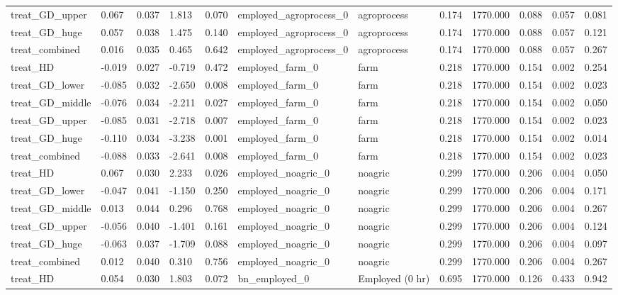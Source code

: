 \begin{tabular}{llllllllllll}
treat\_GD\_upper & 0.067 & 0.037 & 1.813 & 0.070 & employed\_agroprocess\_0 & agroprocess & 0.174 & 1770.000 & 0.088 & 0.057 & 0.081 \\
treat\_GD\_huge & 0.057 & 0.038 & 1.475 & 0.140 & employed\_agroprocess\_0 & agroprocess & 0.174 & 1770.000 & 0.088 & 0.057 & 0.121 \\
treat\_combined & 0.016 & 0.035 & 0.465 & 0.642 & employed\_agroprocess\_0 & agroprocess & 0.174 & 1770.000 & 0.088 & 0.057 & 0.267 \\
treat\_HD & -0.019 & 0.027 & -0.719 & 0.472 & employed\_farm\_0 & farm & 0.218 & 1770.000 & 0.154 & 0.002 & 0.254 \\
treat\_GD\_lower & -0.085 & 0.032 & -2.650 & 0.008 & employed\_farm\_0 & farm & 0.218 & 1770.000 & 0.154 & 0.002 & 0.023 \\
treat\_GD\_middle & -0.076 & 0.034 & -2.211 & 0.027 & employed\_farm\_0 & farm & 0.218 & 1770.000 & 0.154 & 0.002 & 0.050 \\
treat\_GD\_upper & -0.085 & 0.031 & -2.718 & 0.007 & employed\_farm\_0 & farm & 0.218 & 1770.000 & 0.154 & 0.002 & 0.023 \\
treat\_GD\_huge & -0.110 & 0.034 & -3.238 & 0.001 & employed\_farm\_0 & farm & 0.218 & 1770.000 & 0.154 & 0.002 & 0.014 \\
treat\_combined & -0.088 & 0.033 & -2.641 & 0.008 & employed\_farm\_0 & farm & 0.218 & 1770.000 & 0.154 & 0.002 & 0.023 \\
treat\_HD & 0.067 & 0.030 & 2.233 & 0.026 & employed\_noagric\_0 & noagric & 0.299 & 1770.000 & 0.206 & 0.004 & 0.050 \\
treat\_GD\_lower & -0.047 & 0.041 & -1.150 & 0.250 & employed\_noagric\_0 & noagric & 0.299 & 1770.000 & 0.206 & 0.004 & 0.171 \\
treat\_GD\_middle & 0.013 & 0.044 & 0.296 & 0.768 & employed\_noagric\_0 & noagric & 0.299 & 1770.000 & 0.206 & 0.004 & 0.267 \\
treat\_GD\_upper & -0.056 & 0.040 & -1.401 & 0.161 & employed\_noagric\_0 & noagric & 0.299 & 1770.000 & 0.206 & 0.004 & 0.124 \\
treat\_GD\_huge & -0.063 & 0.037 & -1.709 & 0.088 & employed\_noagric\_0 & noagric & 0.299 & 1770.000 & 0.206 & 0.004 & 0.097 \\
treat\_combined & 0.012 & 0.040 & 0.310 & 0.756 & employed\_noagric\_0 & noagric & 0.299 & 1770.000 & 0.206 & 0.004 & 0.267 \\
treat\_HD & 0.054 & 0.030 & 1.803 & 0.072 & bn\_employed\_0 & Employed (0 hr) & 0.695 & 1770.000 & 0.126 & 0.433 & 0.942 \\

\end{tabular}
